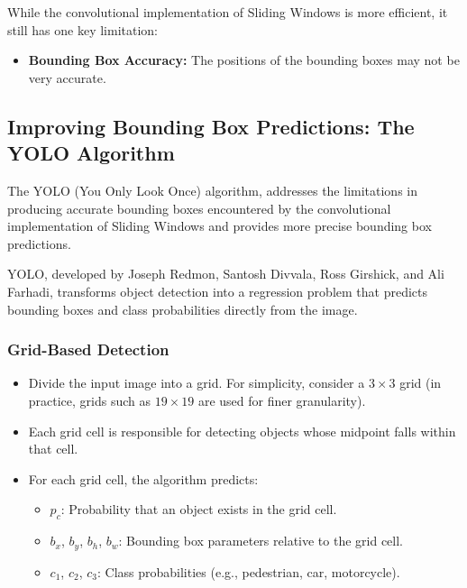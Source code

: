 \documentclass[letterpaper,12pt,notitlepage,twoside]{report}
\begin{document}
While the convolutional implementation of Sliding Windows is more efficient, it still has one key limitation:
\begin{itemize}
    \item \textbf{Bounding Box Accuracy:} The positions of the bounding boxes may not be very accurate.
\end{itemize}

\subsection{Improving Bounding Box Predictions: The YOLO Algorithm}
The YOLO (You Only Look Once) algorithm, addresses the limitations in producing accurate bounding boxes encountered by the convolutional implementation of Sliding Windows and provides more precise bounding box predictions.

YOLO, developed by Joseph Redmon, Santosh Divvala, Ross Girshick, and Ali Farhadi, transforms object detection into a regression problem that predicts bounding boxes and class probabilities directly from the image. 

\subsubsection*{Grid-Based Detection}
\begin{itemize}
    \item Divide the input image into a grid. For simplicity, consider a $3 \times 3$ grid (in practice, grids such as $19 \times 19$ are used for finer granularity).
    \item Each grid cell is responsible for detecting objects whose midpoint falls within that cell.
    \item For each grid cell, the algorithm predicts:
    \begin{itemize}
        \item $p_c$: Probability that an object exists in the grid cell.
        \item $b_x$, $b_y$, $b_h$, $b_w$: Bounding box parameters relative to the grid cell.
        \item $c_1$, $c_2$, $c_3$: Class probabilities (e.g., pedestrian, car, motorcycle).
    \end{itemize}
\end{itemize}
\end{document}
